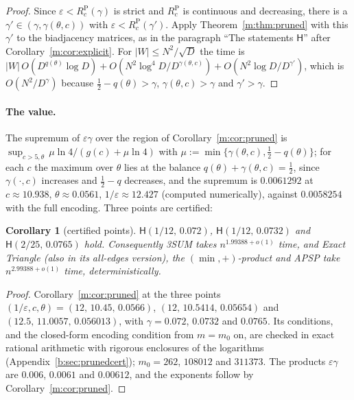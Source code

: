 \documentclass[11pt]{article}
\newtheorem{corollary}[theorem]{Corollary}
\theoremstyle{definition}
\theoremstyle{remark}
\newcommand{\Hyp}{\mathsf{H}}
\newcommand{\EpsGammaBest}{0.00612}%
\newcommand{\ExpThreeSumBest}{1.99388}%
\newcommand{\HypPrunedEps}{2/25}%
\newcommand{\HypPrunedGamma}{0.0765}%
\newcommand{\HypPzeroGamma}{0.072}%
\newcommand{\HypPoneGamma}{0.0732}%
\newcommand{\EpsGammaPzero}{0.006}%
\newcommand{\EpsGammaPone}{0.0061}%
\newcommand{\ExpAPSPBest}{2.99388}%
\newcommand{\EpsGammaPrunedSup}{0.0061292}%
\newcommand{\EpsGammaFullSup}{0.0058254}%
\begin{document}
\begin{proof}
Since $\varepsilon<R^{\mathrm P}_c(\gamma)$ is strict and $R^{\mathrm P}_c$ is continuous and decreasing, there is a $\gamma'\in(\gamma,\gamma(\theta,c))$ with $\varepsilon<R^{\mathrm P}_c(\gamma')$. Apply Theorem~\ref{m:thm:pruned} with this $\gamma'$ to the biadjacency matrices, as in the paragraph ``The statements $\Hyp$'' after Corollary~\ref{m:cor:explicit}. For $|W|\le N^2/\sqrt D$ the time is $|W|\,O(D^{q(\theta)}\log D)+O(N^2\log^4\!D/D^{\gamma(\theta,c)})+O(N^2\log D/D^{\gamma'})$, which is $O(N^2/D^\gamma)$ because $\frac12-q(\theta)>\gamma$, $\gamma(\theta,c)>\gamma$ and $\gamma'>\gamma$.
\end{proof}

\paragraph{The value.} The supremum of $\varepsilon\gamma$ over the region of Corollary~\ref{m:cor:pruned} is $\sup_{c>5,\theta}\,\mu\ln4/(g(c)+\mu\ln4)$ with $\mu:=\min\{\gamma(\theta,c),\frac12-q(\theta)\}$; for each $c$ the maximum over $\theta$ lies at the balance $q(\theta)+\gamma(\theta,c)=\frac12$, since $\gamma(\cdot,c)$ increases and $\frac12-q$ decreases, and the supremum is $\EpsGammaPrunedSup$ at $c\approx10.938$, $\theta\approx0.0561$, $1/\varepsilon\approx12.427$ (computed numerically), against $\EpsGammaFullSup$ with the full encoding. Three points are certified:

\begin{corollary}[certified points]\label{m:cor:prunedpoints}
$\Hyp(1/12,\,\HypPzeroGamma)$, $\Hyp(1/12,\,\HypPoneGamma)$ and $\Hyp(\HypPrunedEps,\,\HypPrunedGamma)$ hold. Consequently 3SUM takes $n^{\ExpThreeSumBest+o(1)}$ time, and Exact Triangle (also in its all-edges version), the $(\min,+)$-product and APSP take $n^{\ExpAPSPBest+o(1)}$ time, deterministically.
\end{corollary}

\begin{proof}
Corollary~\ref{m:cor:pruned} at the three points $(1/\varepsilon,c,\theta)=(12,\,10.45,\,0.0566)$, $(12,\,10.5414,\,0.05654)$ and $(12.5,\,11.0057,\,0.056013)$, with $\gamma=\HypPzeroGamma$, $\HypPoneGamma$ and $\HypPrunedGamma$. Its conditions, and the closed-form encoding condition from $m=m_0$ on, are checked in exact rational arithmetic with rigorous enclosures of the logarithms (Appendix~\ref{b:sec:prunedcert}); $m_0=262$, $108012$ and $311373$. The products $\varepsilon\gamma$ are $\EpsGammaPzero$, $\EpsGammaPone$ and $\EpsGammaBest$, and the exponents follow by Corollary~\ref{m:cor:pruned}.
\end{proof}
\end{document}
